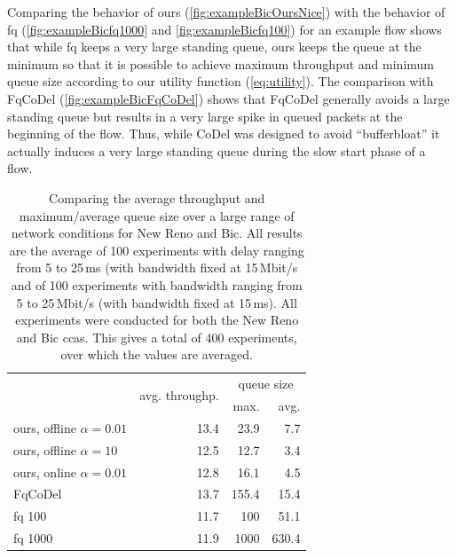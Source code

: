 \documentclass[conference]{IEEEtran}
\begin{document}
Comparing the behavior of \gls{ours} (\autoref{fig:exampleBicOursNice}) with the behavior of fq (\autoref{fig:exampleBicfq1000} and \autoref{fig:exampleBicfq100}) for an example flow shows that while fq keeps a very large standing queue, \gls{ours} keeps the queue at the minimum so that it is possible to achieve maximum throughput and minimum queue size according to our utility function (\autoref{eq:utility}). The comparison with FqCoDel (\autoref{fig:exampleBicFqCoDel}) shows that FqCoDel generally avoids a large standing queue but results in a very large spike in queued packets at the beginning of the flow. Thus, while CoDel was designed to avoid ``bufferbloat'' it actually induces a very large standing queue during the slow start phase of a flow. 

\begin{table}
\caption{Comparing the average throughput and maximum/average queue size over a large range of network conditions for New Reno and Bic. All results are the average of 100 experiments with delay ranging from 5 to 25\,ms (with bandwidth fixed at 15\,Mbit/s and of 100 experiments with bandwidth ranging from 5 to 25\,Mbit/s (with bandwidth fixed at 15\,ms). All experiments were conducted for both the New Reno and Bic \glspl{cca}. This gives a total of 400 experiments, over which the values are averaged.} \label{tab:comparison_others}
\centering
\begin{tabular}{l r r r} \toprule
& \multirow{2}{*}{avg. throughp.} & \multicolumn{2}{c}{queue size} \\
& & max. & avg. \\ \midrule
\gls{ours}, offline $\alpha=0.01$ & 13.4 & 23.9 & 7.7\\
\gls{ours}, offline $\alpha=10$ & 12.5 & 12.7 & 3.4\\
\gls{ours}, online $\alpha=0.01$ & 12.8 & 16.1 & 4.5\\
FqCoDel	& 13.7 & 155.4 & 15.4\\
fq 100	& 11.7 & 100 & 51.1\\
fq 1000	& 11.9 & 1000 & 630.4 \\
\bottomrule
\end{tabular}
\end{table}
\end{document}
